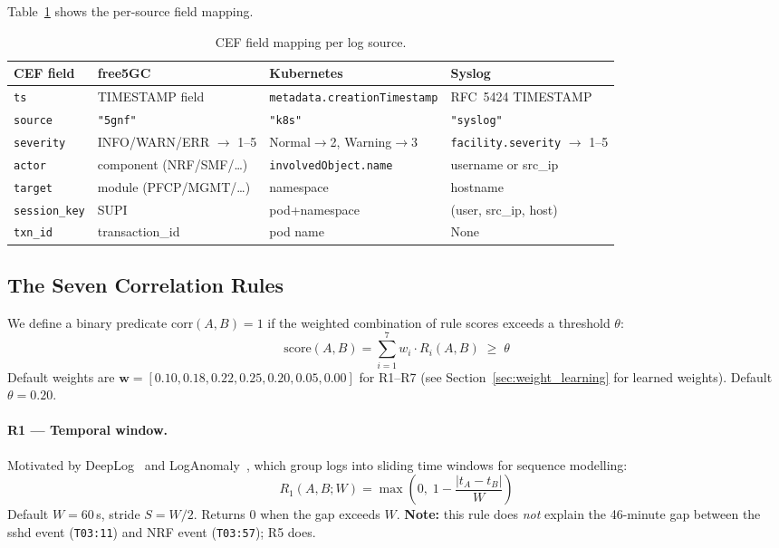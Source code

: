 Table~\ref{tab:cef_mapping} shows the per-source field mapping.

\begin{table}[t]
\centering
\caption{CEF field mapping per log source.}
\label{tab:cef_mapping}
\begin{tabularx}{\columnwidth}{lXXX}
\toprule
\textbf{CEF field} & \textbf{free5GC} & \textbf{Kubernetes} & \textbf{Syslog} \\
\midrule
\texttt{ts}           & TIMESTAMP field & \texttt{metadata.creationTimestamp} & RFC~5424 TIMESTAMP \\
\texttt{source}       & \texttt{"5gnf"} & \texttt{"k8s"} & \texttt{"syslog"} \\
\texttt{severity}     & INFO/WARN/ERR $\to$ 1--5 & Normal$\to$2, Warning$\to$3 & \texttt{facility.severity} $\to$ 1--5 \\
\texttt{actor}        & component (NRF/SMF/…) & \texttt{involvedObject.name} & username or src\_ip \\
\texttt{target}       & module (PFCP/MGMT/…) & namespace & hostname \\
\texttt{session\_key} & SUPI & pod+namespace & (user, src\_ip, host) \\
\texttt{txn\_id}      & transaction\_id & pod name & None \\
\bottomrule
\end{tabularx}
\end{table}

\subsection{The Seven Correlation Rules}
\label{sec:rules}

We define a binary predicate $\text{corr}(A,B) = 1$ if the weighted
combination of rule scores exceeds a threshold $\theta$:
\begin{equation}
\label{eq:combinator}
\text{score}(A,B) = \sum_{i=1}^{7} w_i \cdot R_i(A,B) \;\geq\; \theta
\end{equation}
Default weights are $\mathbf{w} = [0.10, 0.18, 0.22, 0.25, 0.20, 0.05, 0.00]$
for R1–R7 (see Section~\ref{sec:weight_learning} for learned weights).
Default $\theta = 0.20$.

\paragraph{R1 — Temporal window.}
Motivated by DeepLog~\cite{du2017deeplog} and LogAnomaly~\cite{meng2019loganomaly},
which group logs into sliding time windows for sequence modelling:
\begin{equation}
R_1(A,B;W) = \max\!\left(0,\; 1 - \frac{|t_A - t_B|}{W}\right)
\end{equation}
Default $W = 60$\,s, stride $S = W/2$. Returns 0 when the gap exceeds $W$.
\textbf{Note:} this rule does \emph{not} explain the 46-minute gap between
the sshd event (\texttt{T03:11}) and NRF event (\texttt{T03:57}); R5 does.

